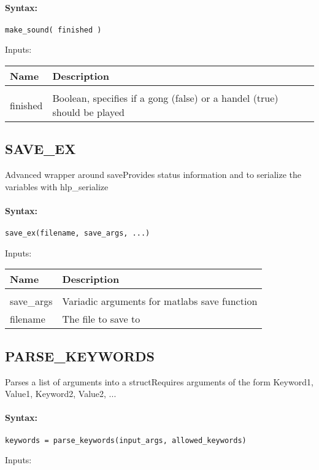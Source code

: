\paragraph{Syntax:} \verb|make_sound( finished )|

Inputs:

\begin{tabular}{|l|p{5cm}|}
\hline
\textbf{Name} & \textbf{Description} \\
\hline \hline \\
finished & Boolean, specifies if a gong (false) or a handel (true) should be played  \\ \hline
\end{tabular}

\subsection{SAVE\_EX}

Advanced wrapper around saveProvides status information and to serialize the variables with hlp\_serialize

\paragraph{Syntax:} \verb|save_ex(filename, save_args, ...)|

Inputs:

\begin{tabular}{|l|p{5cm}|}
\hline
\textbf{Name} & \textbf{Description} \\
\hline \hline \\
save\_args & Variadic arguments for matlabs save function  \\ \hline
filename & The file to save to  \\ \hline
\end{tabular}

\subsection{PARSE\_KEYWORDS}

Parses a list of arguments into a structRequires arguments of the form Keyword1, Value1, Keyword2, Value2, ...

\paragraph{Syntax:} \verb|keywords = parse_keywords(input_args, allowed_keywords)|

Inputs:

